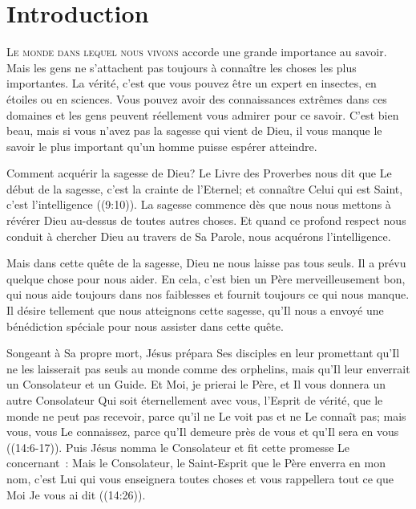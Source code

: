 
\chapter{Introduction}


\lettrine{L}{e monde dans lequel nous vivons} accorde une grande
 importance au savoir. Mais les gens ne s'attachent pas toujours
 à connaître les choses les plus importantes.
 La vérité, c'est que vous pouvez être un expert en insectes,
 en étoiles ou en sciences. Vous pouvez avoir des connaissances extrêmes
 dans ces domaines et les gens peuvent réellement vous admirer pour ce savoir.
 C'est bien beau, mais si vous n'avez pas la sagesse qui vient de Dieu,
 il vous manque le savoir le plus important qu'un homme puisse espérer atteindre.

Comment acquérir la sagesse de Dieu? Le Livre des Proverbes nous dit que
 \og Le début de la sagesse, c'est la crainte de l'Eternel;
 et connaître Celui qui est Saint, c'est l'intelligence \fg{}
 ((9:10)).
 La sagesse commence dès que nous nous mettons à révérer Dieu au-dessus
 de toutes autres choses. Et quand ce profond respect nous conduit
 à chercher Dieu au travers de Sa Parole, nous acquérons l'intelligence.

Mais dans cette quête de la sagesse, Dieu ne nous laisse pas tous seuls.
 Il a prévu quelque chose pour nous aider. En cela, c'est bien un Père
 merveilleusement bon, qui nous aide toujours dans nos faiblesses et fournit
 toujours ce qui nous manque. Il désire tellement que nous atteignons cette
 sagesse, qu'Il nous a envoyé une bénédiction spéciale pour nous assister
 dans cette quête. 

Songeant à Sa propre mort, Jésus prépara Ses disciples en leur promettant
 qu'Il ne les laisserait pas seuls au monde comme des orphelins,
 mais qu'Il leur enverrait un Consolateur et un Guide.
 \og Et Moi, je prierai le Père, et Il vous donnera un autre Consolateur
 Qui soit éternellement avec vous, l'Esprit de vérité, que le monde
 ne peut pas recevoir, parce qu'il ne Le voit pas et ne Le connaît pas;
 mais vous, vous Le connaissez, parce qu'Il demeure près de vous
 et qu'Il sera en vous \fg{} ((14:6-17)).
 Puis Jésus nomma le Consolateur et fit cette promesse Le concernant~:
 \og Mais le Consolateur, le Saint-Esprit que le Père enverra en mon nom,
 c'est Lui qui vous enseignera toutes choses et vous rappellera tout ce que
 Moi Je vous ai dit \fg{} ((14:26)).

